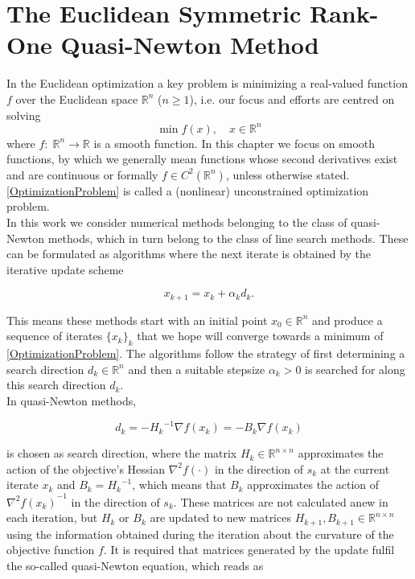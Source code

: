 \chapter{The Euclidean Symmetric Rank-One Quasi-Newton Method}

In the Euclidean optimization a key problem is minimizing a real-valued function $f$ over the Euclidean space $\mathbb{R}^n$ ($n \geq 1$), i.e. our focus and efforts are centred on solving 
\begin{equation}\label{OptimizationProblem}
    \min f(x), \quad x \in \mathbb{R}^n
\end{equation}  
where $f \colon \; \mathbb{R}^n \to \mathbb{R}$ is a smooth function. In this chapter we focus on smooth functions, by which we generally mean functions whose second derivatives exist and are continuous or formally $f \in C^2(\mathbb{R}^n)$, unless otherwise stated. \cref{OptimizationProblem} is called a (nonlinear) unconstrained optimization problem. \\
In this work we consider numerical methods belonging to the class of quasi-Newton methods, which in turn belong to the class of line search methods. These can be formulated as algorithms where the next iterate is obtained by the iterative update scheme

\begin{equation*}
    x_{k+1} = x_k + \alpha_k d_k.
\end{equation*}

This means these methods start with an initial point $x_0 \in \mathbb{R}^n$ and produce a sequence of iterates $\{x_k\}_k$ that we hope will converge towards a minimum of \cref{OptimizationProblem}. The algorithms follow the strategy of first determining a search direction $d_k \in \mathbb{R}^n$ and then a suitable stepsize $\alpha_k > 0$ is searched for along this search direction $d_k$. \\
In quasi-Newton methods, 

\begin{equation*}
    d_k = -{H_k}^{-1} \nabla f(x_k) = -B_k \nabla f(x_k)
\end{equation*}

is chosen as search direction, where the matrix $H_k \in \mathbb{R}^{n \times n}$ approximates the action of the objective's Hessian $\nabla^{2} f(\cdot)$ in the direction of $s_k$ at the current iterate $x_k$ and $B_k = {H_k}^{-1}$, which means that $B_k$ approximates the action of ${\nabla^{2} f(x_k)}^{-1}$ in the direction of $s_k$. These matrices are not calculated anew in each iteration, but $H_k$ or $B_k$ are updated to new matrices $H_{k+1}, B_{k+1} \in \mathbb{R}^{n \times n}$ using the information obtained during the iteration about the curvature of the objective function $f$. It is required that matrices generated by the update fulfil the so-called quasi-Newton equation, which reads as 

